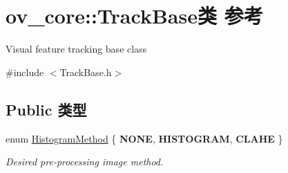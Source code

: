 \hypertarget{classov__core_1_1TrackBase}{}\section{ov\+\_\+core\+:\+:Track\+Base类 参考}
\label{classov__core_1_1TrackBase}


Visual feature tracking base class  




{\ttfamily \#include $<$Track\+Base.\+h$>$}

\subsection*{Public 类型}
\begin{DoxyCompactItemize}
\item 
\mbox{\label{classov__core_1_1TrackBase_aa4b34a5dce99b59522d57bf9278c9a1a}} 
enum \hyperlink{classov__core_1_1TrackBase_aa4b34a5dce99b59522d57bf9278c9a1a}{Histogram\+Method} \{ {\bfseries N\+O\+NE}, 
{\bfseries H\+I\+S\+T\+O\+G\+R\+AM}, 
{\bfseries C\+L\+A\+HE}
 \}\begin{DoxyCompactList}\small\item\em Desired pre-\/processing image method. \end{DoxyCompactList}
\end{DoxyCompactItemize}
